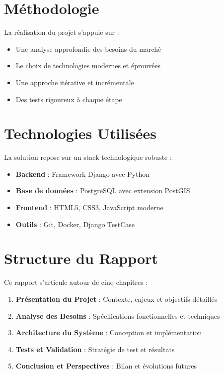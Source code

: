 \section*{Méthodologie}
La réalisation du projet s'appuie sur :
\begin{itemize}
    \item Une analyse approfondie des besoins du marché
    \item Le choix de technologies modernes et éprouvées
    \item Une approche itérative et incrémentale
    \item Des tests rigoureux à chaque étape
\end{itemize}

\section*{Technologies Utilisées}
La solution repose sur un stack technologique robuste :
\begin{itemize}
    \item \textbf{Backend} : Framework Django avec Python
    \item \textbf{Base de données} : PostgreSQL avec extension PostGIS
    \item \textbf{Frontend} : HTML5, CSS3, JavaScript moderne
    \item \textbf{Outils} : Git, Docker, Django TestCase
\end{itemize}

\section*{Structure du Rapport}
Ce rapport s'articule autour de cinq chapitres :

\begin{enumerate}
    \item \textbf{Présentation du Projet} : Contexte, enjeux et objectifs détaillés
    
    \item \textbf{Analyse des Besoins} : Spécifications fonctionnelles et techniques
    
    \item \textbf{Architecture du Système} : Conception et implémentation
    
    \item \textbf{Tests et Validation} : Stratégie de test et résultats
    
    \item \textbf{Conclusion et Perspectives} : Bilan et évolutions futures
\end{enumerate}

